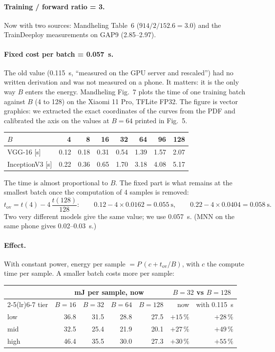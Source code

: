 \documentclass[11pt,a4paper]{article}
\begin{document}
\paragraph{Training / forward ratio = 3.} Now with two sources: Mandheling
Table~6 ($914/2/152.6 = 3.0$) and the TrainDeeploy measurements on GAP9
(2.85--2.97).

\paragraph{Fixed cost per batch = \SI{0.057}{\second}.} The old value
(\SI{0.115}{\second}, ``measured on the GPU server and rescaled'') had no
written derivation and was not measured on a phone. It matters: it is the
only way $B$ enters the energy. Mandheling Fig.~7 plots the time of one
training batch against $B$ (4 to 128) on the Xiaomi 11 Pro, TFLite FP32. The
figure is vector graphics: we extracted the exact coordinates of the curves
from the PDF and calibrated the axis on the values at $B=64$ printed in
Fig.~5.

\begin{center}
\begin{tabular}{lrrrrrrr}
\toprule
$B$ & 4 & 8 & 16 & 32 & 64 & 96 & 128 \\
\midrule
VGG-16 [s]      & 0.12 & 0.18 & 0.31 & 0.54 & 1.39 & 1.57 & 2.07 \\
InceptionV3 [s] & 0.22 & 0.36 & 0.65 & 1.70 & 3.18 & 4.08 & 5.17 \\
\bottomrule
\end{tabular}
\end{center}

The time is almost proportional to $B$. The fixed part is what remains at the
smallest batch once the computation of 4 samples is removed:
\[
t_\text{ov} = t(4) - 4\,\frac{t(128)}{128}:\qquad
0.12 - 4\times 0.0162 = \SI{0.055}{\second},\qquad
0.22 - 4\times 0.0404 = \SI{0.058}{\second}.
\]
Two very different models give the same value; we use \SI{0.057}{\second}.
(MNN on the same phone gives 0.02--0.03~s.)

\paragraph{Effect.} With constant power, energy per sample $=P\,(c + t_\text{ov}/B)$,
with $c$ the compute time per sample. A smaller batch costs more per sample:

\begin{center}
\begin{tabular}{lrrrrrr}
\toprule
& \multicolumn{4}{c}{mJ per sample, now} & \multicolumn{2}{c}{$B=32$ vs $B=128$} \\
\cmidrule(lr){2-5}\cmidrule(lr){6-7}
tier & $B=16$ & $B=32$ & $B=64$ & $B=128$ & now & with \SI{0.115}{\second} \\
\midrule
low  & 36.8 & 31.5 & 28.8 & 27.5 & $+15\,\%$ & $+28\,\%$ \\
mid  & 32.5 & 25.4 & 21.9 & 20.1 & $+27\,\%$ & $+49\,\%$ \\
high & 46.4 & 35.5 & 30.0 & 27.3 & $+30\,\%$ & $+55\,\%$ \\
\bottomrule
\end{tabular}
\end{center}
\end{document}
